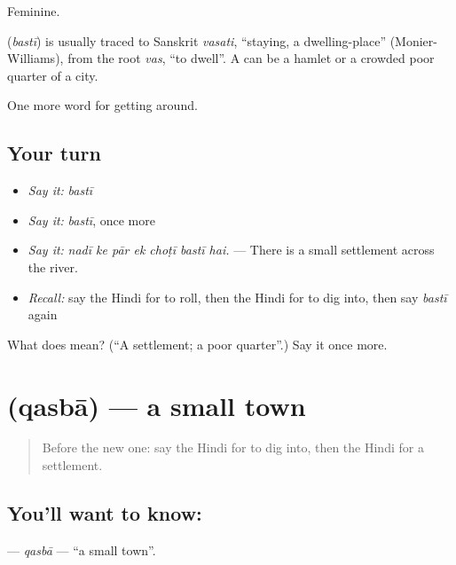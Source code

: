 Feminine.

\begin{cousinweb}
\textbf{} (\emph{bastī}) is usually traced to Sanskrit \emph{vasati}, \textquotedblleft{}staying, a dwelling-place\textquotedblright{} (Monier-Williams), from the root \emph{vas}, \textquotedblleft{}to dwell\textquotedblright{}. A  can be a hamlet or a crowded poor quarter of a city.
\end{cousinweb}

\begin{grammarlens}[title={What you've built}]
One more word for getting around.
\end{grammarlens}

\subsection*{Your turn}
\begin{itemize}
\raggedright
  \item \emph{Say it:} \emph{bastī}
  \item \emph{Say it:} \emph{bastī}, once more
  \item \emph{Say it:} \emph{nadī ke pār ek choṭī bastī hai.} — There is a small settlement across the river.
  \item \emph{Recall:} say the Hindi for to roll, then the Hindi for to dig into, then say \emph{bastī} again
\end{itemize}

\begin{tcolorbox}[breakable,colback=teal!4,colframe=teal!35!black,title={Before you move on}]
What does  mean? (\textquotedblleft{}A settlement; a poor quarter\textquotedblright{}.) Say it once more.
\end{tcolorbox}
\section[\texorpdfstring{\hi{क़स्बा} (qasbā)}{क़स्बा (qasbā)}]{ (qasbā) — a small town}

\label{lesson:HI-C421-qasba}



\begin{quote}
Before the new one: say the Hindi for to dig into, then the Hindi for a settlement.
\end{quote}

\subsection*{You'll want to know: }
\textbf{} — \emph{qasbā} — \textquotedblleft{}a small town\textquotedblright{}.

